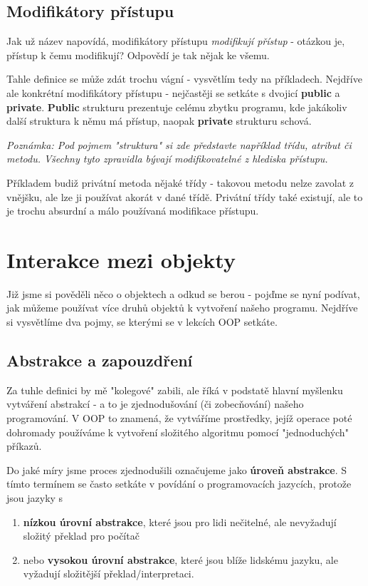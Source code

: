 \subsection{Modifikátory přístupu}
Jak už název napovídá, modifikátory přístupu \textit{modifikují přístup} - otázkou je, přístup k čemu modifikují? Odpovědí je tak nějak ke všemu.

Tahle definice se může zdát trochu vágní - vysvětlím tedy na příkladech. Nejdříve ale konkrétní modifikátory přístupu - nejčastěji se setkáte s dvojicí \textbf{public} a \textbf{private}. \textbf{Public} strukturu prezentuje celému zbytku programu, kde jakákoliv další struktura k němu má přístup, naopak \textbf{private} strukturu schová.

\textit{Poznámka: Pod pojmem "struktura" si zde představte například třídu, atribut či metodu. Všechny tyto zpravidla bývají modifikovatelné z hlediska přístupu.}

Příkladem budiž privátní metoda nějaké třídy - takovou metodu nelze zavolat z vnějšku, ale lze ji používat akorát v dané třídě. Privátní třídy také existují, ale to je trochu absurdní a málo používaná modifikace přístupu.

\section{Interakce mezi objekty}
Již jsme si pověděli něco o objektech a odkud se berou - pojďme se nyní podívat, jak můžeme používat více druhů objektů k vytvoření našeho programu. Nejdříve si vysvětlíme dva pojmy, se kterými se v lekcích OOP setkáte.

\subsection{Abstrakce a zapouzdření}
Za tuhle definici by mě "kolegové" zabili, ale říká v podstatě hlavní myšlenku vytváření abstrakcí - a to je zjednodušování (či zobecňování) našeho programování. V OOP to znamená, že vytváříme prostředky, jejíž operace poté dohromady používáme k vytvoření složitého algoritmu pomocí "jednoduchých" příkazů.

Do jaké míry jsme proces zjednodušili označujeme jako \textbf{úroveň abstrakce}. S tímto termínem se často setkáte v povídání o programovacích jazycích, protože jsou jazyky s 

\begin{enumerate}
	\item \textbf{nízkou úrovní abstrakce}, které jsou pro lidi nečitelné, ale nevyžadují složitý překlad pro počítač
	\item nebo \textbf{vysokou úrovní abstrakce}, které jsou blíže lidskému jazyku, ale vyžadují složitější překlad/interpretaci. 
\end{enumerate}

